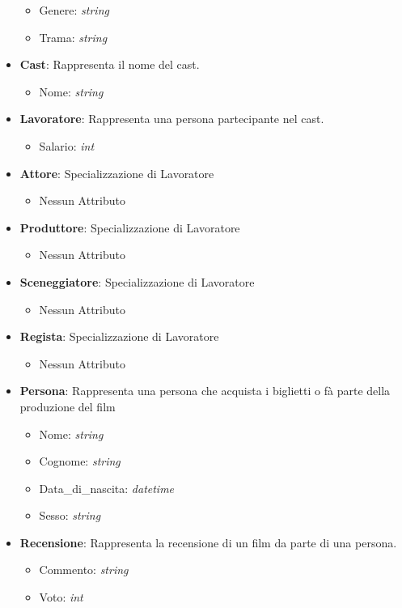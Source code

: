 \documentclass[10pt]{article}
\begin{document}
\begin{itemize}
\begin{itemize}
			\item Genere: \textit{string}
			\item Trama: \textit{string}
		\end{itemize}
		\item \textbf{Cast}: Rappresenta il nome del cast.
		\begin{itemize}
			\item Nome: \textit{string}
		\end{itemize}
		\item \textbf{Lavoratore}: Rappresenta una persona partecipante nel cast.
		\begin{itemize}
			\item Salario: \textit{int}
		\end{itemize}
		\item \textbf{Attore}: Specializzazione di Lavoratore
		\begin{itemize}
			\item Nessun Attributo
		\end{itemize}
		\item \textbf{Produttore}: Specializzazione di Lavoratore
		\begin{itemize}
			\item Nessun Attributo
		\end{itemize}
		\item \textbf{Sceneggiatore}: Specializzazione di Lavoratore
		\begin{itemize}
			\item Nessun Attributo
		\end{itemize}
		\item \textbf{Regista}: Specializzazione di Lavoratore
		\begin{itemize}
			\item Nessun Attributo
		\end{itemize}
		\item \textbf{Persona}: Rappresenta una persona che acquista i biglietti o fà parte della produzione del film
		\begin{itemize}
			\item Nome: \textit{string}
			\item Cognome: \textit{string}
			\item Data\_di\_nascita: \textit{datetime}	
			\item Sesso: \textit{string}
		\end{itemize}
		\item \textbf{Recensione}: Rappresenta la recensione di un film da parte di una persona.
		\begin{itemize}
			\item Commento: \textit{string}
			\item Voto: \textit{int}
		\end{itemize}
	\end{itemize}
\end{document}

